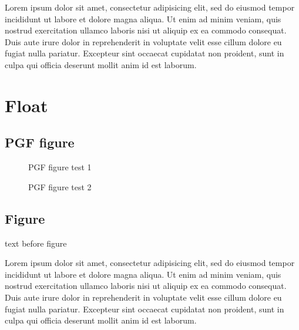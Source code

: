 \documentclass[10pt,a4paper,extrafontsizes,oldfontcommands,oneside]{memoir}
\begin{document}
Lorem ipsum dolor sit amet, consectetur adipisicing elit, sed do eiusmod tempor incididunt ut labore et dolore magna aliqua. Ut enim ad minim veniam, quis nostrud exercitation ullamco laboris nisi ut aliquip ex ea commodo consequat. Duis aute irure dolor in reprehenderit in voluptate velit esse cillum dolore eu fugiat nulla pariatur. Excepteur sint occaecat cupidatat non proident, sunt in culpa qui officia deserunt mollit anim id est laborum.





\section{Float} %
\label{sec:float}

\subsection{PGF figure} %
\label{sub:pgf_figure}

\begin{figure}[!htbp]

\caption{PGF figure test 1}
\label{fig:pgftest}
\end{figure}

\begin{figure}[!htbp]

\caption{PGF figure test 2}
\label{fig:pgftest2}
\end{figure}



\subsection{Figure} %
\label{sub:figure}

text before figure

Lorem ipsum dolor sit amet, consectetur adipisicing elit, sed do eiusmod tempor incididunt ut labore et dolore magna aliqua. Ut enim ad minim veniam, quis nostrud exercitation ullamco laboris nisi ut aliquip ex ea commodo consequat. Duis aute irure dolor in reprehenderit in voluptate velit esse cillum dolore eu fugiat nulla pariatur. Excepteur sint occaecat cupidatat non proident, sunt in culpa qui officia deserunt mollit anim id est laborum.
\end{document}
